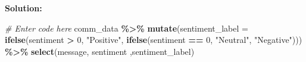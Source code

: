 \documentclass[
]{article}
\newenvironment{Shaded}{\begin{snugshade}}{\end{snugshade}}
\newcommand{\AttributeTok}[1]{\textcolor[rgb]{0.13,0.29,0.53}{#1}}
\newcommand{\CommentTok}[1]{\textcolor[rgb]{0.56,0.35,0.01}{\textit{#1}}}
\newcommand{\DecValTok}[1]{\textcolor[rgb]{0.00,0.00,0.81}{#1}}
\newcommand{\FunctionTok}[1]{\textcolor[rgb]{0.13,0.29,0.53}{\textbf{#1}}}
\newcommand{\NormalTok}[1]{#1}
\newcommand{\SpecialCharTok}[1]{\textcolor[rgb]{0.81,0.36,0.00}{\textbf{#1}}}
\newcommand{\StringTok}[1]{\textcolor[rgb]{0.31,0.60,0.02}{#1}}
\begin{document}
\textbf{Solution:}

\begin{Shaded}
\begin{Highlighting}[]
\CommentTok{\# Enter code here}
\NormalTok{comm\_data }\SpecialCharTok{\%\textgreater{}\%}
  \FunctionTok{mutate}\NormalTok{(}\AttributeTok{sentiment\_label =} \FunctionTok{ifelse}\NormalTok{(sentiment }\SpecialCharTok{\textgreater{}} \DecValTok{0}\NormalTok{, }\StringTok{"Positive"}\NormalTok{,}
                          \FunctionTok{ifelse}\NormalTok{(sentiment }\SpecialCharTok{==} \DecValTok{0}\NormalTok{, }\StringTok{"Neutral"}\NormalTok{, }
                                 \StringTok{"Negative"}\NormalTok{))) }\SpecialCharTok{\%\textgreater{}\%}
  \FunctionTok{select}\NormalTok{(message, sentiment ,sentiment\_label)}
\end{Highlighting}
\end{Shaded}
\end{document}
